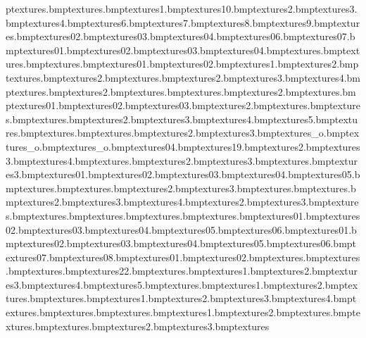 p textures\clockbell.bmp textures\clockhammer.bmp textures\clothes1.bmp textures\clothes10.bmp textures\clothes2.bmp textures\clothes3.bmp textures\clothes4.bmp textures\clothes6.bmp textures\clothes7.bmp textures\clothes8.bmp textures\clothes9.bmp textures\clubsandwich.bmp textures\clubsandwich02.bmp textures\clubsandwich03.bmp textures\clubsandwich04.bmp textures\clubsandwich06.bmp textures\clubsandwich07.bmp textures\coins01.bmp textures\coins02.bmp textures\coins03.bmp textures\coins04.bmp textures\crossing.bmp textures\crossinglines.bmp textures\dynamite.bmp textures\dynamite01.bmp textures\dynamite02.bmp textures\elecbox1.bmp textures\elechut2.bmp textures\electricfence.bmp textures\electricfence2.bmp textures\electricfencesign.bmp textures\electricfencesmash2.bmp textures\electricfencesmash3.bmp textures\electricfencesmash4.bmp textures\electricfencewall.bmp textures\electricfencewall2.bmp textures\electricfencewallsmash.bmp textures\electricfencewire.bmp textures\electricfencewire2.bmp textures\fblu.bmp textures\feather01.bmp textures\feather02.bmp textures\feather03.bmp textures\fence2.bmp textures\fgre.bmp textures\floorsteel.bmp textures\footprint.bmp textures\footprint2.bmp textures\footprint3.bmp textures\footprint4.bmp textures\footprint5.bmp textures\fpurp.bmp textures\fred.bmp textures\fries.bmp textures\fries2.bmp textures\fries3.bmp textures_o.bmp textures_o.bmp textures_o.bmp textures\fruit04.bmp textures\sign19.bmp textures\grassedge2.bmp textures\grassedge3.bmp textures\grassedge4.bmp textures\grassjoiner.bmp textures\grassjoiner2.bmp textures\grassjoiner3.bmp textures\grassshad.bmp textures\grassshad3.bmp textures\grasstocobble01.bmp textures\grasstocobble02.bmp textures\grasstocobble03.bmp textures\grasstocobble04.bmp textures\grasstocobble05.bmp textures\grasswedge.bmp textures\grasswedgepurp.bmp textures\grasswedgepurp2.bmp textures\grasswedgepurp3.bmp textures\grassy.bmp textures\hamper.bmp textures\hamper2.bmp textures\hamper3.bmp textures\hamper4.bmp textures\hampfod2.bmp textures\hampfod3.bmp textures\hampfood.bmp textures\hamplid.bmp textures\happymeal.bmp textures\hitsignexplan.bmp textures\hotdog.bmp textures\hubflowers01.bmp textures\hubflowers02.bmp textures\hubflowers03.bmp textures\hubflowers04.bmp textures\hubflowers05.bmp textures\hubflowers06.bmp textures\hubpath01.bmp textures\hubpath02.bmp textures\hubpath03.bmp textures\hubpath04.bmp textures\hubpath05.bmp textures\hubpath06.bmp textures\hubpath07.bmp textures\hubpath08.bmp textures\hubpathcorner01.bmp textures\hubpathcorner02.bmp textures\hutbackwin.bmp textures\hutcounter.bmp textures\hutorangpal.bmp textures\sign22.bmp textures\hutstripesbar.bmp textures\hutwallyellow1.bmp textures\hutwallyellow2.bmp textures\hutwallyellow3.bmp textures\hutwallyellow4.bmp textures\hutwallyellow5.bmp textures\hutwallyelroof.bmp textures\hutwallyelroof1.bmp textures\hutwallyelroof2.bmp textures\hutwardensign.bmp textures\hutwardroof.bmp textures\hutwin1.bmp textures\hutwin2.bmp textures\hutwin3.bmp textures\hutwin4.bmp textures\hutwood.bmp textures\hutwoodlight.bmp textures\hutyellchimney.bmp textures\hutyelldoor1.bmp textures\hutyelldoor2.bmp textures\hutyellowpal.bmp textures\hutyellroofedge.bmp textures\hutyellsign.bmp textures\iceloll2.bmp textures\iceloll3.bmp textures\ic